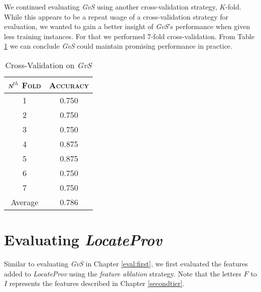 We continued evaluating {\it GvS} using another cross-validation strategy, $K$-fold. While this appears to be a repeat usage of a cross-validation strategy for evaluation, we wanted to gain a better insight of {\it GvS}'s performance when given less training instances. For that we performed 7-fold cross-validation. From Table \ref{tab:crossvalidation} we can conclude {\it GvS} could maintain promising performance in practice.
\begin{table}[h]
	\singlespacingplus
	\center
	\begin{tabular}{ c c }
		\textsc{{\it n}$^{th}$ Fold} & \textsc{Accuracy} \\
		\hline
		1 & 0.750 \\
		2 & 0.750 \\
		3 & 0.750 \\
		4 & 0.875 \\
		5 & 0.875 \\
		6 & 0.750 \\
		7 & 0.750 \\
		Average & 0.786 \\
	\end{tabular}
	\caption{Cross-Validation on {\it GvS}}
	\label{tab:crossvalidation}
\end{table}

\section{Evaluating {\it LocateProv}}
\label{eval:second}
Similar to evaluating {\it GvS} in Chapter \ref{eval:first}, we first evaluated the features added to {\it LocateProv} using the {\it feature ablation} strategy. Note that the letters $F$ to $I$ represents the features described in Chapter \ref{secondtier}.


